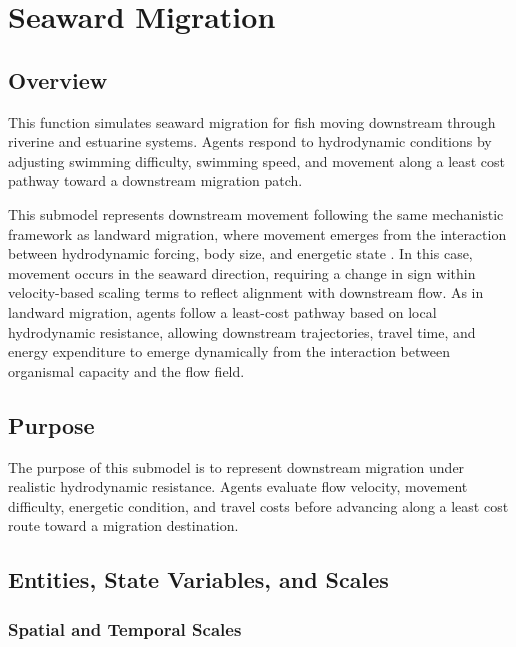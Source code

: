 \documentclass[
]{book}
\begin{document}
\chapter{Seaward Migration}\label{seaward-migration}

\section{Overview}\label{overview-8}

This function simulates seaward migration for fish moving downstream through riverine and estuarine systems. Agents respond to hydrodynamic conditions by adjusting swimming difficulty, swimming speed, and movement along a least cost pathway toward a downstream migration patch.

This submodel represents downstream movement following the same
mechanistic framework as landward migration, where movement emerges from
the interaction between hydrodynamic forcing, body size, and energetic
state \citep{brown_toward_2004, gibson_selective_2001}. In this case,
movement occurs in the seaward direction, requiring a change in sign
within velocity-based scaling terms to reflect alignment with downstream
flow. As in landward migration, agents follow a least-cost pathway based
on local hydrodynamic resistance, allowing downstream trajectories,
travel time, and energy expenditure to emerge dynamically from the
interaction between organismal capacity and the flow field.

\section{Purpose}\label{purpose-7}

The purpose of this submodel is to represent downstream migration under realistic hydrodynamic resistance. Agents evaluate flow velocity, movement difficulty, energetic condition, and travel costs before advancing along a least cost route toward a migration destination.

\section{Entities, State Variables, and Scales}\label{entities-state-variables-and-scales-8}

\subsection{Spatial and Temporal Scales}\label{spatial-and-temporal-scales-8}
\end{document}
